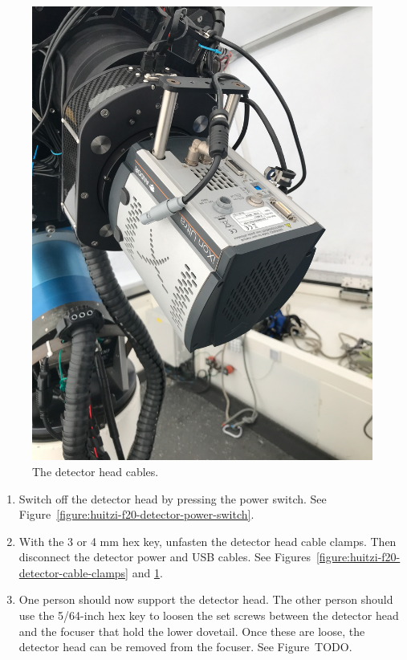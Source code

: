 \begin{enumerate}
\begin{figure}
\begin{center}
\includegraphics[angle=0,width=0.8\linewidth]{figures/huitzi-f20-detector-cables}
\end{center}
\caption{The detector head cables.}
\label{figure:huitzi-f20-detector-cables}
\end{figure}

\begin{enumerate}    

  \item Switch off the detector head by pressing the power switch. See Figure~\ref{figure:huitzi-f20-detector-power-switch}.
  
  \item With the 3 or 4 mm hex key, unfasten the detector head cable clamps. Then disconnect the detector power and USB cables. See Figures~\ref{figure:huitzi-f20-detector-cable-clamps} and \ref{figure:huitzi-f20-detector-cables}.

  \item One person should now support the detector head. The other person should use the 5/64-inch hex key to loosen the set screws between the detector head and the focuser that hold the lower dovetail. Once these are loose, the detector head can be removed from the focuser. See Figure~TODO.
  

\end{enumerate}
\end{enumerate}
